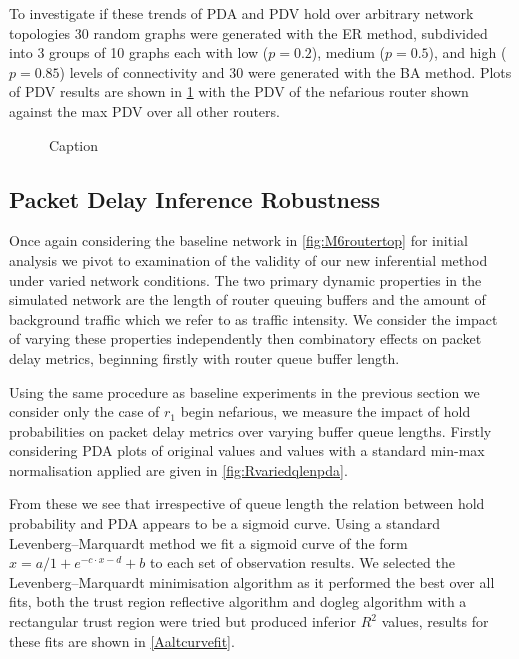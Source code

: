 To investigate if these trends of PDA and PDV hold over arbitrary network topologies 30 random graphs were generated with the ER method, subdivided into 3 groups of 10 graphs each with low ($p=0.2$), medium ($p=0.5$), and high ($p=0.85$) levels of connectivity and 30 were generated with the BA method. Plots of PDV results are shown in \cref{fig:Rrandgraphpdv} with the PDV of the nefarious router shown against the max PDV over all other routers.

\begin{figure}[H]
    \centering
    \caption{Caption}
    \label{fig:Rrandgraphpdv}
\end{figure}

\subsection{Packet Delay Inference Robustness}
Once again considering the baseline network in \cref{fig:M6routertop} for initial analysis we pivot to examination of the validity of our new inferential method under varied network conditions. The two primary dynamic properties in the simulated network are the length of router queuing buffers and the amount of background traffic which we refer to as traffic intensity. We consider the impact of varying these properties independently then combinatory effects on packet delay metrics, beginning firstly with router queue buffer length.\par
Using the same procedure as baseline experiments in the previous section we consider only the case of $r_1$ begin nefarious, we measure the impact of hold probabilities on packet delay metrics over varying buffer queue lengths. Firstly considering PDA plots of original values and values with a standard min-max normalisation applied are given in \cref{fig:Rvariedqlenpda}.\par
From these we see that irrespective of queue length the relation between hold probability and PDA appears to be a sigmoid curve. Using a standard Levenberg–Marquardt method \cite{osborne_nonlinear_1976} we fit a sigmoid curve of the form $x=a/1+e^{-c\cdot x-d} + b$ to each set of observation results. We selected the Levenberg–Marquardt minimisation algorithm as it performed the best over all fits, both the trust region reflective algorithm and dogleg algorithm with a rectangular trust region were tried but produced inferior $R^2$ values, results for these fits are shown in \cref{Aaltcurvefit}.\par
